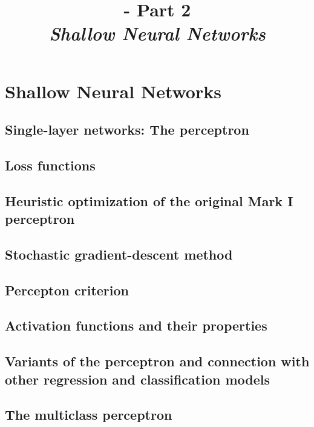 \renewcommand{\prevlecture}{1 }
\renewcommand{\thislecture}{2 }
\renewcommand{\nextlecture}{3 }

%
%

\section{Shallow Neural Networks}

\title[\modulename - Part \thislecture]
{
  {\bf 
   \modulename - 
   Part \thislecture\\
  }
  \vspace{0.5cm}
  {\it 
   \color{yellow}
    Shallow Neural Networks\\
  }
}



\begin{frame}[plain]
  \titlepage
\end{frame}



\subsection{Single-layer networks: The perceptron}
\subsection{Loss functions}
\subsection{Heuristic optimization of the original Mark I perceptron}
\subsection{Stochastic gradient-descent method}
\subsection{Percepton criterion}
\subsection{Activation functions and their properties}
\subsection{Variants of the perceptron and connection with other regression and classification models}
\subsection{The multiclass perceptron}
